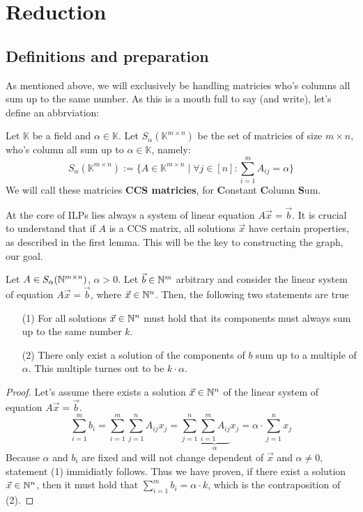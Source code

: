 \section{Reduction}
\subsection{Definitions and preparation}
As mentioned above, we will exclusively be handling matricies who's columns all sum up to the same number. As this is a mouth full to say (and write), let's define an abbrviation:

\begin{definition}
    \label{def:CCS}
    Let $\mathbb{K}$ be a field and $\alpha \in \mathbb{K}$. Let $S_{\alpha}(\mathbb{K}^{m \times n})$ be the set of matricies of size $m \times n$, who's column all sum up to $\alpha \in \mathbb{K}$, namely:
    $$S_{\alpha}(\mathbb{K}^{m \times n}) := \{A \in \mathbb{K}^{m \times n}\mid \forall j \in [n]\colon \sum_{i=1}^{m} A_{ij} = \alpha\}$$
    We will call these matricies \textbf{CCS matricies}, for \textbf{C}onstant \textbf{C}olumn \textbf{S}um.
\end{definition}

At the core of ILPs lies always a system of linear equation $A \vec x = \vec b$. It is crucial to understand that if $A$ is a CCS matrix, all solutions $\vec x$ have certain properties, as described in the first lemma. This will be the key to constructing the graph, our goal. 

\begin{lemma}
    \label{lemma:ilp_pre1}
    Let $A\in S_\alpha(\mathbb{N}^{m \times n})$, $\alpha > 0$. Let $\vec b \in \mathbb{N}^m$ arbitrary and consider the linear system of equation $A\vec x=\vec b$, where $\vec x \in \mathbb{N}^n$. Then, the following two statements are true

    \begin{enumerate}
        \item[(1)] For all solutions $\vec x \in \mathbb{N}^n$ must hold that its components must always sum up to the same number $k$.
        \item[(2)] There only exist a solution of the components of $b$ sum up to a multiple of $\alpha$. This multiple turnes out to be $k \cdot \alpha$.
    \end{enumerate}
\end{lemma}

\begin{proof}
    Let's assume there exists a solution $\vec x \in \mathbb{N}^n$ of the linear system of equation $A\vec x=\vec b$.
    $$\sum_{i=1}^m b_i = \sum_{i=1}^{m}\sum_{j=1}^{n}A_{ij} x_j = \sum_{j=1}^{n}\underbrace{\sum_{i=1}^{m}A_{ij}}_\alpha x_j = \alpha \cdot \sum_{j=1}^{n}x_j$$
    Because $\alpha$ and $b_i$ are fixed and will not change dependent of $\vec x$ and $\alpha \neq 0$, statement (1) immidiatly follows. Thus we have proven, if there exist a solution $\vec x \in \mathbb{N}^n$, then it must hold that $\sum_{i=1}^{m}b_i = \alpha \cdot k$, which is the contraposition of (2).
\end{proof}


